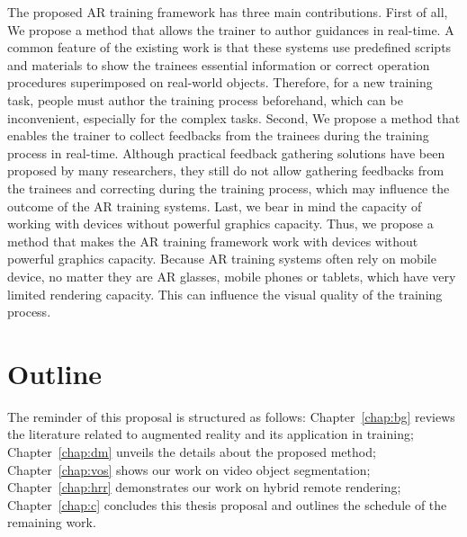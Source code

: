 The proposed AR training framework has three main contributions.
First of all, We propose a method that allows the trainer to author guidances in real-time. A common feature of the existing work is that these systems use predefined scripts and materials to show the trainees essential information or correct operation procedures superimposed on real-world objects. Therefore, for a new training task, people must author the training process beforehand, which can be inconvenient, especially for the complex tasks.
Second, We propose a method that enables the trainer to collect feedbacks from the trainees during the training process in real-time. Although practical feedback gathering solutions have been proposed by many researchers, they still do not allow gathering feedbacks from the trainees and correcting during the training process, which may influence the outcome of the AR training systems.
Last, we bear in mind the capacity of working with devices without powerful graphics capacity. Thus, we propose a method that makes the AR training framework work with devices without powerful graphics capacity. Because AR training systems often rely on mobile device, no matter they are AR glasses, mobile phones or tablets, which have very limited rendering capacity. This can influence the visual quality of the training process.

\section{Outline}
\label{sec:i:ol}

The reminder of this proposal is structured as follows: Chapter~\ref{chap:bg} reviews the literature related to augmented reality and its application in training; Chapter~\ref{chap:dm} unveils the details about the proposed method; Chapter~\ref{chap:vos} shows our work on video object segmentation; Chapter~\ref{chap:hrr} demonstrates our work on hybrid remote rendering; Chapter~\ref{chap:c} concludes this thesis proposal and outlines the schedule of the remaining work.
